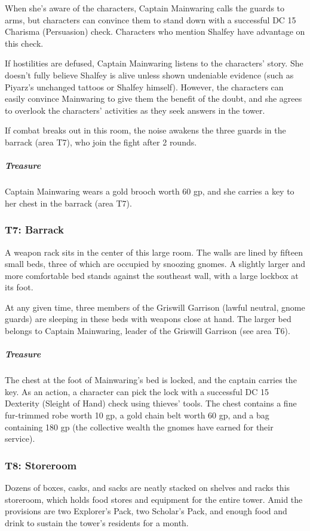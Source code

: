 \documentclass[10pt,a4paper,twoside,bg=print,twocolumn,openany,nodeprecatedcode]{dndbook}
\begin{document}
When she's aware of the characters, Captain Mainwaring calls the guards to arms, but characters can convince them to stand down with a successful DC 15 Charisma (Persuasion) check. Characters who mention Shalfey have advantage on this check.

If hostilities are defused, Captain Mainwaring listens to the characters' story. She doesn't fully believe Shalfey is alive unless shown undeniable evidence (such as Piyarz's unchanged tattoos or Shalfey himself). However, the characters can easily convince Mainwaring to give them the benefit of the doubt, and she agrees to overlook the characters' activities as they seek answers in the tower.

If combat breaks out in this room, the noise awakens the three guards in the barrack (area T7), who join the fight after 2 rounds.

\subparagraph{Treasure}
Captain Mainwaring wears a gold brooch worth 60 gp, and she carries a key to her chest in the barrack (area T7).

\subsubsection{T7: Barrack}
\begin{DndReadAloud}{}
A weapon rack sits in the center of this large room. The walls are lined by fifteen small beds, three of which are occupied by snoozing gnomes. A slightly larger and more comfortable bed stands against the southeast wall, with a large lockbox at its foot.

\end{DndReadAloud}

At any given time, three members of the Griswill Garrison (lawful neutral, gnome guards) are sleeping in these beds with weapons close at hand. The larger bed belongs to Captain Mainwaring, leader of the Griswill Garrison (see area T6).

\subparagraph{Treasure}
The chest at the foot of Mainwaring's bed is locked, and the captain carries the key. As an action, a character can pick the lock with a successful DC 15 Dexterity (Sleight of Hand) check using thieves' tools. The chest contains a fine fur-trimmed robe worth 10 gp, a gold chain belt worth 60 gp, and a bag containing 180 gp (the collective wealth the gnomes have earned for their service).

\subsubsection{T8: Storeroom}
Dozens of boxes, casks, and sacks are neatly stacked on shelves and racks this storeroom, which holds food stores and equipment for the entire tower. Amid the provisions are two Explorer's Pack, two Scholar's Pack, and enough food and drink to sustain the tower's residents for a month.
\end{document}
